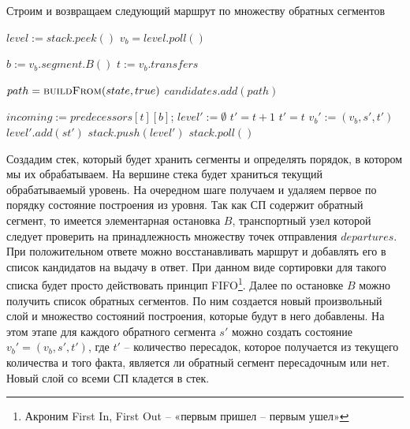 \begin{algorithm}[!h]
	\caption{Строим и возвращаем следующий маршрут по множеству обратных сегментов}\label{lst5}
	\begin{algorithmic}
		\State $level := stack.peek()$ 
		\State $v_b = level.poll()$ 
		
		\State $b := v_b.segment.B()$
		\State $t := v_b.transfers$
		
		 
		\State $path = \Call{buildFrom}{state, true}$ 
		\State $candidates.add(path)$ 
		\EndIf
		
		\State $incoming := predecessors[t][b]$;
		\State $level' := \emptyset$ 
		\State $t' = t + 1$
		\Else
		\State $t' = t$
		\EndIf
		\State $v_b' := (v_b, s', t')$
		\State $level'.add(st')$
		\EndFor
		\State $stack.push(level')$
		\EndIf
		\Else
		\State $stack.poll()$ 
		\EndIf
		\EndWhile
		\EndFunction
	\end{algorithmic}
\end{algorithm}

Создадим стек, который будет хранить сегменты и определять порядок, в котором мы их обрабатываем. На вершине стека будет храниться текущий обрабатываемый уровень. На очередном шаге получаем и удаляем первое по порядку состояние построения из уровня. Так как СП содержит обратный сегмент, то имеется элементарная остановка $B$, транспортный узел которой следует проверить на принадлежность множеству точек отправления $departures$. При положительном ответе можно восстанавливать маршрут и добавлять его в список кандидатов на выдачу в ответ. При данном виде сортировки для такого списка будет просто действовать принцип FIFO\footnote{Акроним First In, First Out -- «первым пришел -- первым ушел»}. Далее по остановке $B$ можно получить список обратных сегментов. По ним создается новый произвольный слой и множество состояний построения, которые будут в него добавлены. На этом этапе для каждого обратного сегмента $s'$ можно создать состояние $v_b'=(v_b, s', t')$, где $t'$ -- количество пересадок, которое получается из текущего количества и того факта, является ли обратный сегмент пересадочным или нет. Новый слой со всеми СП кладется в стек.

